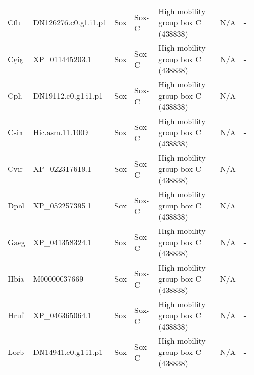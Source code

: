 \documentclass[../main.tex]{subfiles}
\begin{document}
\begin{landscape}
\begin{longtable}{lllllll}
		Cflu           & DN126276.c0.g1.i1.p1  & Sox            & Sox-C               & High mobility group box C (438838)          & N/A                                                                    & -                    \\
		Cgig           & XP\_011445203.1       & Sox            & Sox-C               & High mobility group box C (438838)          & N/A                                                                    & -                    \\
		Cpli           & DN19112.c0.g1.i1.p1   & Sox            & Sox-C               & High mobility group box C (438838)          & N/A                                                                    & -                    \\
		Csin           & Hic.asm.11.1009       & Sox            & Sox-C               & High mobility group box C (438838)          & N/A                                                                    & -                    \\
		Cvir           & XP\_022317619.1       & Sox            & Sox-C               & High mobility group box C (438838)          & N/A                                                                    & -                    \\
		Dpol           & XP\_052257395.1       & Sox            & Sox-C               & High mobility group box C (438838)          & N/A                                                                    & -                    \\
		Gaeg           & XP\_041358324.1       & Sox            & Sox-C               & High mobility group box C (438838)          & N/A                                                                    & -                    \\
		Hbia           & M00000037669          & Sox            & Sox-C               & High mobility group box C (438838)          & N/A                                                                    & -                    \\
		Hruf           & XP\_046365064.1       & Sox            & Sox-C               & High mobility group box C (438838)          & N/A                                                                    & -                    \\
		Lorb           & DN14941.c0.g1.i1.p1   & Sox            & Sox-C               & High mobility group box C (438838)          & N/A                                                                    & -                    \\

\end{longtable}
\end{landscape}
\end{document}
